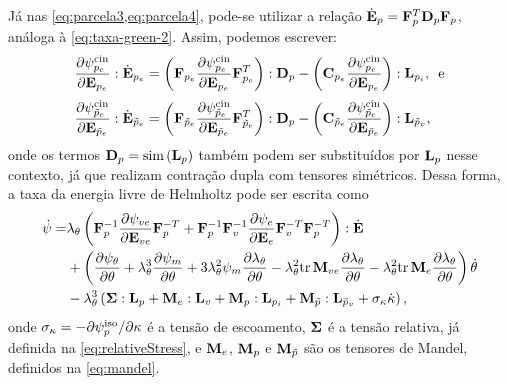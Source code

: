 \documentclass[Tese.tex]{subfiles}
\begin{document}
Já nas \cref{eq:parcela3,eq:parcela4}, pode-se utilizar a relação $\dot{\mathbf{E}}_p = \mathbf{F}_p^T\mathbf{D}_p\mathbf{F}_p$, análoga à \cref{eq:taxa-green-2}. Assim, podemos escrever:
\begin{align}
& \dfrac{\partial \psi_{p_e}^\text{cin}}{\partial \mathbf{E}_{p_e}}:\dot{\mathbf{E}}_{p_e} = \left(\mathbf{F}_{p_e}\dfrac{\partial \psi_{p_e}^\text{cin}}{\partial \mathbf{E}_{p_e}}\mathbf{F}_{p_e}^{T}\right):\mathbf{D}_p - \left(\mathbf{C}_{p_e}\dfrac{\partial \psi_{p_e}^\text{cin}}{\partial \mathbf{E}_{p_e}}\right):\mathbf{L}_{p_i}, \text{\, e} \label{eq:parcela3-2}\\[0.1cm]
& \dfrac{\partial \psi_{\tilde{p}_e}^\text{cin}}{\partial \mathbf{E}_{\tilde{p}_e}}:\dot{\mathbf{E}}_{\tilde{p}_e} = \left(\mathbf{F}_{\tilde{p}_e}\dfrac{\partial \psi_{\tilde{p}_e}^\text{cin}}{\partial \mathbf{E}_{\tilde{p}_e}}\mathbf{F}_{\tilde{p}_e}^{T}\right):\mathbf{D}_p - \left(\mathbf{C}_{\tilde{p}_e}\dfrac{\partial \psi_{\tilde{p}_e}^\text{cin}}{\partial \mathbf{E}_{\tilde{p}_e}}\right):\mathbf{L}_{\tilde{p}_v}, \label{eq:parcela4-2}
\end{align}
onde os termos $\mathbf{D}_p=\text{sim}\,(\mathbf{L}_p)$ também podem ser substituídos por $\mathbf{L}_p$ nesse contexto, já que realizam contração dupla com tensores simétricos. Dessa forma, a taxa da energia livre de Helmholtz pode ser escrita como
\begin{equation}
\begin{aligned} \label{eq:dothelmholtz-vep}
\dot{\psi} = & \lambda_{\theta}\left(\mathbf{F}_p^{-1}\dfrac{\partial \psi_{ve}}{\partial \mathbf{E}_{ve}}\mathbf{F}_p^{-T} + \mathbf{F}_p^{-1}\mathbf{F}_v^{-1}\dfrac{\partial \psi_e}{\partial \mathbf{E}_e}\mathbf{F}_v^{-T}\mathbf{F}_p^{-T}\right):\dot{\mathbf{E}} \\& + \left(\dfrac{\partial \psi_{\theta}}{\partial \theta} + \lambda_{\theta}^3\dfrac{\partial \psi_m}{\partial \theta} + 3\lambda_{\theta}^2\psi_m\dfrac{\partial \lambda_{\theta}}{\partial \theta} - \lambda_{\theta}^{2}\text{tr}\,\mathbf{M}_{ve}\dfrac{\partial \lambda_{\theta}}{\partial \theta}  - \lambda_{\theta}^{2}\text{tr}\,\mathbf{M}_e\dfrac{\partial \lambda_{\theta}}{\partial \theta}\right)\dot{\theta} \\&- \lambda_{\theta}^3\left(\boldsymbol{\Sigma}:\mathbf{L}_p + \mathbf{M}_e:\mathbf{L}_v + \mathbf{M}_p:\mathbf{L}_{p_i} + \mathbf{M}_{\tilde{p}}:\mathbf{L}_{\tilde{p}_v} + \sigma_{\kappa}\dot{\kappa}\right)
,
\end{aligned}
\end{equation}
onde $\sigma_{\kappa} = -\partial\psi_p^\text{iso}/\partial\kappa$ é a tensão de escoamento, $\boldsymbol{\Sigma}$ é a tensão relativa, já definida na \cref{eq:relativeStress}, e $\mathbf{M}_e$, $\mathbf{M}_p$ e $\mathbf{M}_{\tilde{p}}$ são os tensores de Mandel, definidos na \cref{eq:mandel}.
\end{document}
